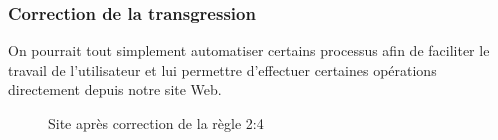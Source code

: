 \documentclass{article}[12pt]
\begin{document}
    \subsubsection*{Correction de la transgression}
    On pourrait tout simplement automatiser certains processus afin de faciliter le travail de l'utilisateur et lui permettre d'effectuer certaines opérations directement depuis notre site Web.
     \begin{figure}[H]
    	\centering
        \caption{Site après correction de la règle 2:4}
    \end{figure}

\end{document}
